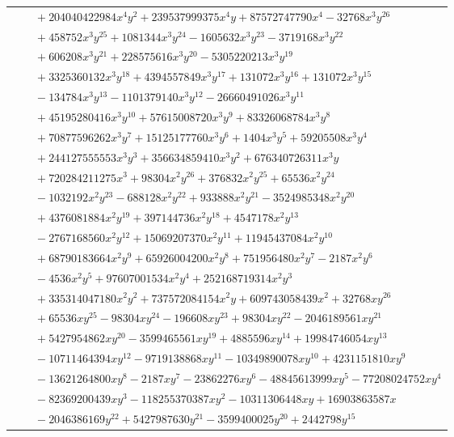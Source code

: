 \documentclass[11pt]{article}
\begin{document}
\begin{longtable}{@{}ll@{}}
 & $\quad +204040422984x^{4}y^{2}+239537999375x^{4}y+87572747790x^{4}-32768x^{3}y^{26}$\\
 & $\quad +458752x^{3}y^{25}+1081344x^{3}y^{24}-1605632x^{3}y^{23}-3719168x^{3}y^{22}$\\
 & $\quad +606208x^{3}y^{21}+228575616x^{3}y^{20}-5305220213x^{3}y^{19}$\\
 & $\quad +3325360132x^{3}y^{18}+4394557849x^{3}y^{17}+131072x^{3}y^{16}+131072x^{3}y^{15}$\\
 & $\quad -134784x^{3}y^{13}-1101379140x^{3}y^{12}-26660491026x^{3}y^{11}$\\
 & $\quad +45195280416x^{3}y^{10}+57615008720x^{3}y^{9}+83326068784x^{3}y^{8}$\\
 & $\quad +70877596262x^{3}y^{7}+15125177760x^{3}y^{6}+1404x^{3}y^{5}+59205508x^{3}y^{4}$\\
 & $\quad +244127555553x^{3}y^{3}+356634859410x^{3}y^{2}+676340726311x^{3}y$\\
 & $\quad +720284211275x^{3}+98304x^{2}y^{26}+376832x^{2}y^{25}+65536x^{2}y^{24}$\\
 & $\quad -1032192x^{2}y^{23}-688128x^{2}y^{22}+933888x^{2}y^{21}-3524985348x^{2}y^{20}$\\
 & $\quad +4376081884x^{2}y^{19}+397144736x^{2}y^{18}+4547178x^{2}y^{13}$\\
 & $\quad -2767168560x^{2}y^{12}+15069207370x^{2}y^{11}+11945437084x^{2}y^{10}$\\
 & $\quad +68790183664x^{2}y^{9}+65926004200x^{2}y^{8}+751956480x^{2}y^{7}-2187x^{2}y^{6}$\\
 & $\quad -4536x^{2}y^{5}+97607001534x^{2}y^{4}+252168719314x^{2}y^{3}$\\
 & $\quad +335314047180x^{2}y^{2}+737572084154x^{2}y+609743058439x^{2}+32768xy^{26}$\\
 & $\quad +65536xy^{25}-98304xy^{24}-196608xy^{23}+98304xy^{22}-2046189561xy^{21}$\\
 & $\quad +5427954862xy^{20}-3599465561xy^{19}+4885596xy^{14}+19984746054xy^{13}$\\
 & $\quad -10711464394xy^{12}-9719138868xy^{11}-10349890078xy^{10}+4231151810xy^{9}$\\
 & $\quad -13621264800xy^{8}-2187xy^{7}-23862276xy^{6}-48845613999xy^{5}-77208024752xy^{4}$\\
 & $\quad -82369200439xy^{3}-118255370387xy^{2}-10311306448xy+16903863587x$\\
 & $\quad -2046386169y^{22}+5427987630y^{21}-3599400025y^{20}+2442798y^{15}$\\

\end{longtable}
\end{document}
